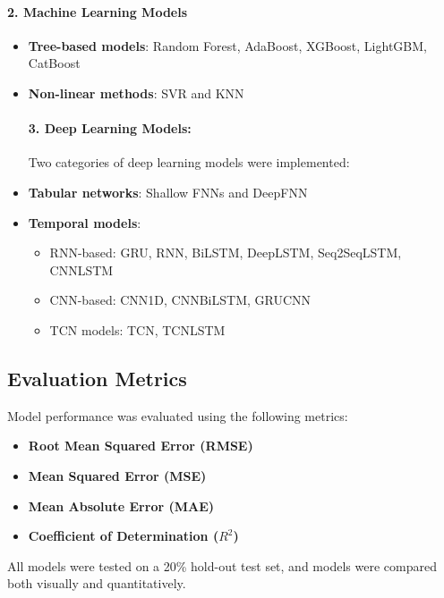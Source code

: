 \documentclass[12pt]{article}
\begin{document}
\paragraph{2. Machine Learning Models}
\begin{itemize}
    \item \textbf{Tree-based models}: Random Forest, AdaBoost, XGBoost, LightGBM, CatBoost
    
    \item \textbf{Non-linear methods}: SVR and KNN 


\paragraph{3. Deep Learning Models:} Two categories of deep learning models were implemented:

    \item \textbf{Tabular networks}: Shallow FNNs and DeepFNN
    
    \item \textbf{Temporal models}:
    \begin{itemize}
        \item RNN-based: GRU, RNN, BiLSTM, DeepLSTM, Seq2SeqLSTM, CNNLSTM
        \item CNN-based: CNN1D, CNNBiLSTM, GRUCNN
        \item TCN models: TCN, TCNLSTM

    \end{itemize}

\end{itemize}

\subsection{Evaluation Metrics}
\label{sec:metrics}

Model performance was evaluated using the following metrics:
\begin{itemize}
    \item \textbf{Root Mean Squared Error (RMSE)}
    \item \textbf{Mean Squared Error (MSE)}
    \item \textbf{Mean Absolute Error (MAE)} 
    \item \textbf{Coefficient of Determination ($R^2$)} 
\end{itemize}

All models were tested on a 20\% hold-out test set, and models were compared both visually and quantitatively.
\end{document}
